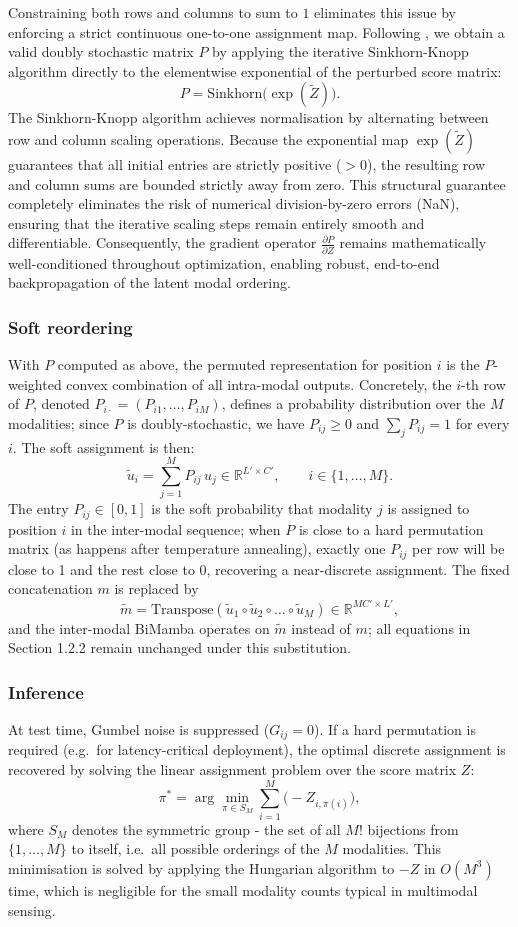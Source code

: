 \documentclass[11pt,a4paper]{article}
\newcommand{\R}{\mathbb{R}}
\begin{document}
	Constraining both rows and columns to sum to $1$ eliminates this issue by enforcing a strict continuous one-to-one assignment map. Following \cite{mena2018}, we obtain a valid doubly stochastic matrix $P$ by applying the iterative Sinkhorn-Knopp algorithm directly to the elementwise exponential of the perturbed score matrix:
	$$P = \text{Sinkhorn}\bigl(\exp(\tilde{Z})\bigr).$$
	The Sinkhorn-Knopp algorithm achieves normalisation by alternating between row and column scaling operations. Because the exponential map $\exp(\tilde{Z})$ guarantees that all initial entries are strictly positive ($>0$), the resulting row and column sums are bounded strictly away from zero. This structural guarantee completely eliminates the risk of numerical division-by-zero errors (NaN), ensuring that the iterative scaling steps remain entirely smooth and differentiable. Consequently, the gradient operator $\displaystyle \frac{\partial P}{\partial Z}$ remains mathematically well-conditioned throughout optimization, enabling robust, end-to-end backpropagation of the latent modal ordering.
	
	\subsubsection*{Soft reordering}
	With $P$ computed as above, the permuted representation for position $i$ is the $P$-weighted convex combination of all intra-modal outputs. Concretely, the $i$-th row of $P$, denoted $P_{i\cdot} = (P_{i1}, \dots, P_{iM})$, defines a probability distribution over the $M$ modalities; since $P$ is doubly-stochastic, we have $P_{ij} \geq 0$ and $\sum_j P_{ij} = 1$ for every $i$. The soft assignment is then:
	$$\tilde{u}_i = \sum_{j=1}^{M} P_{ij}\,u_j \in \R^{L' \times C'}, \qquad i \in \{1,\dots,M\}.$$
	The entry $P_{ij} \in [0,1]$ is the soft probability that modality $j$ is assigned to position $i$ in the inter-modal sequence; when $P$ is close to a hard permutation matrix (as happens after temperature annealing), exactly one $P_{ij}$ per row will be close to 1 and the rest close to 0, recovering a near-discrete assignment. The fixed concatenation $m$ is replaced by
	$$\tilde{m} = \text{Transpose}(\tilde{u}_1 \circ \tilde{u}_2 \circ \dots \circ \tilde{u}_M) \in \R^{MC' \times L'},$$
	and the inter-modal BiMamba operates on $\tilde{m}$ instead of $m$; all equations in Section 1.2.2 remain unchanged under this substitution.
	
	\subsubsection*{Inference}
	At test time, Gumbel noise is suppressed ($G_{ij} = 0$). If a hard permutation is required (e.g.\ for latency-critical deployment), the optimal discrete assignment is recovered by solving the linear assignment problem over the score matrix $Z$:
	$$\pi^* = \arg\min_{\pi \in S_M} \sum_{i=1}^{M} \bigl(-Z_{i,\pi(i)}\bigr),$$
	where $S_M$ denotes the symmetric group - the set of all $M!$ bijections from $\{1,\dots,M\}$ to itself, i.e.\ all possible orderings of the $M$ modalities. This minimisation is solved by applying the Hungarian algorithm to $-Z$ in $O(M^3)$ time, which is negligible for the small modality counts typical in multimodal sensing.
	
\end{document}
